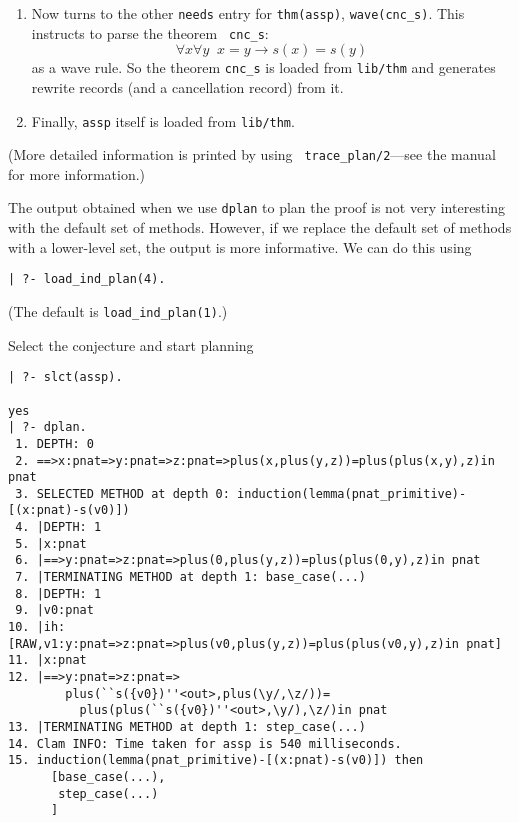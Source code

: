 \documentclass{article}
\begin{document}
\begin{enumerate}
\item
Now \clam turns to the other {\tt needs} entry for {\tt thm(assp)},
{\tt wave(cnc\_s)}.  This instructs \clam to parse the theorem {\tt
cnc\_s}:
%
\[ \forall x \forall y \; \; x=y \rightarrow s(x)=s(y) \]
%
as a wave rule.
So the theorem {\tt cnc\_s} is loaded from {\tt lib/thm} and \clam
generates rewrite records (and a cancellation record) from it.

\item
Finally, {\tt assp} itself is loaded from {\tt lib/thm}.

\end{enumerate}

(More detailed information is printed by using {\tt
trace\_plan/2}---see the manual for more information.)

The output obtained when we use {\tt dplan} to plan the proof is not very
interesting with the default set of methods. However, if we replace the
default set of methods with a lower-level set, the output is more
informative.  We can do this using 
%
\begin{verbatim}
| ?- load_ind_plan(4).
\end{verbatim}
(The default is \verb|load_ind_plan(1)|.)

Select the conjecture and start planning
\begin{verbatim}
| ?- slct(assp).

yes
| ?- dplan.
 1. DEPTH: 0
 2. ==>x:pnat=>y:pnat=>z:pnat=>plus(x,plus(y,z))=plus(plus(x,y),z)in pnat
 3. SELECTED METHOD at depth 0: induction(lemma(pnat_primitive)-[(x:pnat)-s(v0)])
 4. |DEPTH: 1
 5. |x:pnat
 6. |==>y:pnat=>z:pnat=>plus(0,plus(y,z))=plus(plus(0,y),z)in pnat
 7. |TERMINATING METHOD at depth 1: base_case(...)
 8. |DEPTH: 1
 9. |v0:pnat
10. |ih:[RAW,v1:y:pnat=>z:pnat=>plus(v0,plus(y,z))=plus(plus(v0,y),z)in pnat]
11. |x:pnat
12. |==>y:pnat=>z:pnat=>
        plus(``s({v0})''<out>,plus(\y/,\z/))=
          plus(plus(``s({v0})''<out>,\y/),\z/)in pnat
13. |TERMINATING METHOD at depth 1: step_case(...)
14. Clam INFO: Time taken for assp is 540 milliseconds.
15. induction(lemma(pnat_primitive)-[(x:pnat)-s(v0)]) then 
      [base_case(...),
       step_case(...)
      ]
\end{verbatim}
\end{document}
